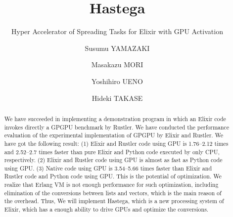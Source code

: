 \documentclass[sigplan,table]{acmart}
\begin{document}
\title{Hastega}
\subtitle{Hyper Accelerator of Spreading Tasks for Elixir with GPU Activation}

\author{Susumu YAMAZAKI}

\author{Masakazu MORI}

\author{Yoshihiro UENO}

\author{Hideki TAKASE}

\renewcommand{\shortauthors}{S. Yamazaki et al.}


\begin{abstract}
We have succeeded in implementing a demonstration program in which an Elixir code invokes directly a GPGPU benchmark by Rustler. We have conducted the performance evaluation of the experimental implementation of GPGPU by Elixir and Rustler. We have got the following result: (1) Elixir and Rustler code using GPU is 1.76--2.12 times and 2.52--2.7 times faster than pure Elixir and Python code executed by only CPU, respectively. (2) Elixir and Rustler code using GPU is almost as fast as Python code using GPU. (3) Native code using GPU is 3.54--5.66 times faster than Elixir and Rustler code and Python code using GPU. This is the potential of optimization. We realize that Erlang VM is not enough performance for such optimization, including elimination of the conversions between lists and vectors, which is the main reason of the overhead. Thus, We will implement Hastega, which is a new processing system of Elixir, which has a enough ability to drive GPUs and optimize the conversions.
\end{abstract}
\end{document}
